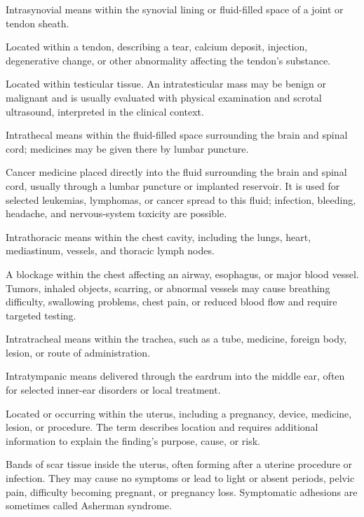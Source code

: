  Intrasynovial means within the synovial lining or fluid-filled space of a joint or tendon sheath.

 Located within a tendon, describing a tear, calcium deposit, injection, degenerative change, or other abnormality affecting the tendon's substance.

 Located within testicular tissue. An intratesticular mass may be benign or malignant and is usually evaluated with physical examination and scrotal ultrasound, interpreted in the clinical context.

 Intrathecal means within the fluid-filled space surrounding the brain and spinal cord; medicines may be given there by lumbar puncture.

 Cancer medicine placed directly into the fluid surrounding the brain and spinal cord, usually through a lumbar puncture or implanted reservoir. It is used for selected leukemias, lymphomas, or cancer spread to this fluid; infection, bleeding, headache, and nervous-system toxicity are possible.

 Intrathoracic means within the chest cavity, including the lungs, heart, mediastinum, vessels, and thoracic lymph nodes.

 A blockage within the chest affecting an airway, esophagus, or major blood vessel. Tumors, inhaled objects, scarring, or abnormal vessels may cause breathing difficulty, swallowing problems, chest pain, or reduced blood flow and require targeted testing.

 Intratracheal means within the trachea, such as a tube, medicine, foreign body, lesion, or route of administration.

 Intratympanic means delivered through the eardrum into the middle ear, often for selected inner-ear disorders or local treatment.

 Located or occurring within the uterus, including a pregnancy, device, medicine, lesion, or procedure. The term describes location and requires additional information to explain the finding’s purpose, cause, or risk.

 Bands of scar tissue inside the uterus, often forming after a uterine procedure or infection. They may cause no symptoms or lead to light or absent periods, pelvic pain, difficulty becoming pregnant, or pregnancy loss. Symptomatic adhesions are sometimes called Asherman syndrome.

